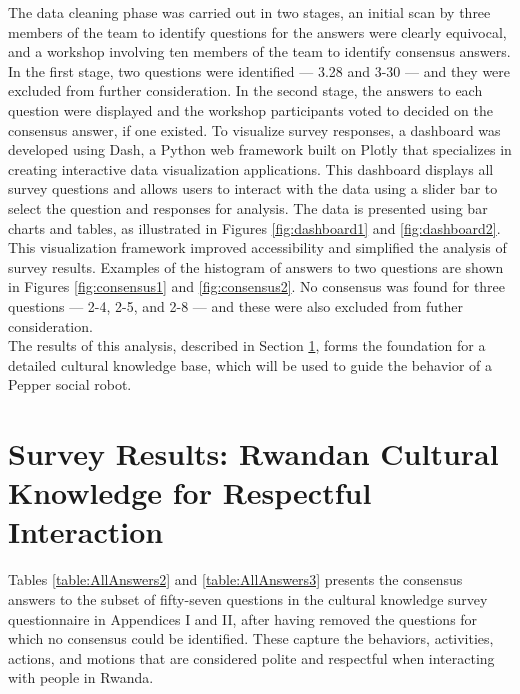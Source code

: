 \documentclass{CSSRforAfrica}
\begin{document}
\noindent The data cleaning phase was carried out in two stages, an initial scan by three members of the team to identify questions for the answers were clearly equivocal, and a workshop involving ten members of the team to identify consensus answers.  In the first stage, two questions were identified --- 3.28 and 3-30 --- and they were excluded from further consideration.  In the second stage, the answers to each question were displayed and the workshop participants voted to decided on the consensus answer, if one existed.  To visualize survey responses, a dashboard was developed using Dash, a Python web framework built on Plotly that specializes in creating interactive data visualization applications. This dashboard displays all survey questions and allows users to interact with the data using a slider bar to select the question and responses for analysis. The data is presented using bar charts and tables, as illustrated in Figures \ref{fig:dashboard1} and \ref{fig:dashboard2}. This visualization framework improved accessibility and simplified the analysis of survey results. Examples of the histogram of answers to two questions are shown in Figures \ref{fig:consensus1} and \ref{fig:consensus2}.   No consensus was found for three questions ---  2-4, 2-5, and 2-8  --- and these were also excluded from futher consideration.\\

\noindent The results of this  analysis, described in Section \ref{section:knowledge},  forms the foundation for  a detailed cultural knowledge base, which will be used to guide the behavior of a Pepper social robot.
 



\clearpage

\section{Survey Results: Rwandan Cultural Knowledge for Respectful Interaction}
\label{section:knowledge}


Tables \ref{table:AllAnswers2}  and \ref{table:AllAnswers3} presents the consensus answers to the subset of fifty-seven questions in the cultural knowledge survey questionnaire in Appendices I and II, after having removed the questions for which no consensus could be identified. These capture the behaviors, activities, actions, and motions that are considered polite and respectful when interacting with people in Rwanda.\\~\\
\end{document}
